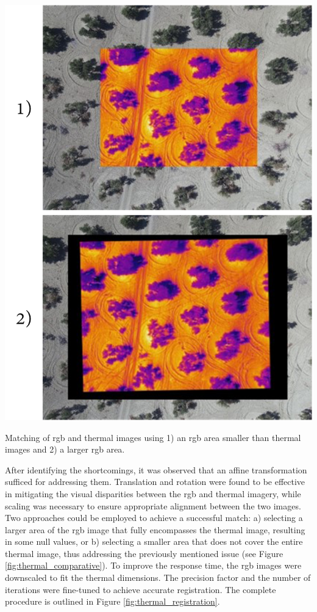 \begin{marginfigure}[-2cm]
    \includegraphics{figs/image_fusion/thermal_comparative.png}
    \caption{Matching of \acrshort{rgb} and thermal images using 1) an \acrshort{rgb} area smaller than thermal images and 2) a larger \acrshort{rgb} area. }
    \label{fig:thermal_comparative}
\end{marginfigure}
After identifying the shortcomings, it was observed that an affine transformation sufficed for addressing them. Translation and rotation were found to be effective in mitigating the visual disparities between the \acrshort{rgb} and thermal imagery, while scaling was necessary to ensure appropriate alignment between the two images. Two approaches could be employed to achieve a successful match: a) selecting a larger area of the \acrshort{rgb} image that fully encompasses the thermal image, resulting in some null values, or b) selecting a smaller area that does not cover the entire thermal image, thus addressing the previously mentioned issue (see Figure \ref{fig:thermal_comparative}). To improve the response time, the \acrshort{rgb} images were downscaled to fit the thermal dimensions. The precision factor and the number of iterations were fine-tuned to achieve accurate registration. The complete procedure is outlined in Figure \ref{fig:thermal_registration}.

